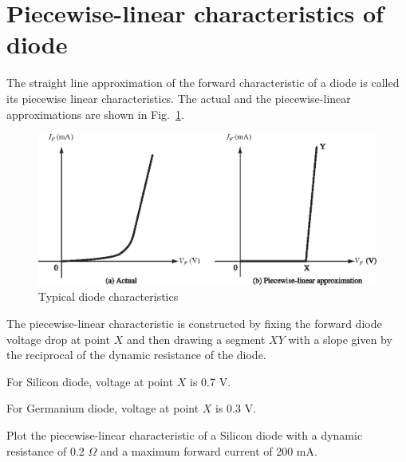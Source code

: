 \section{Piecewise-linear characteristics of diode}\label{sec1.14}

The straight line approximation of the forward characteristic of a
diode is called its piecewise linear characteristics. The actual and
the piecewise-linear approximations are shown in Fig.~\ref{fig1.12}.
\begin{figure}[H]
\centering
\includegraphics{chap1/S3-EE-01-025.eps}
\medskip
\caption{Typical diode characteristics}\label{fig1.12}
\end{figure}

The piecewise-linear characteristic is constructed by fixing the
forward diode voltage drop at point $X$ and then drawing a segment
$XY$ with a slope given by the reciprocal of the dynamic resistance of
the diode.

For Silicon diode, voltage at point $X$ is 0.7 V.

For Germanium diode, voltage at point $X$ is 0.3 V.


\begin{example}\label{exam1.13}
Plot the piecewise-linear characteristic of a Silicon diode with a
dynamic resistance of 0.2 $\Omega$ and a maximum forward current of
200 mA.
\end{example}

